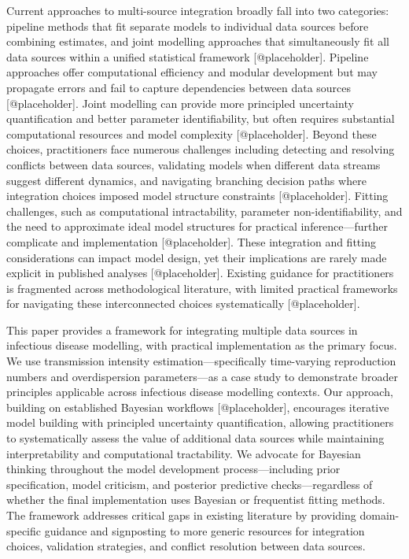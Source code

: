 \documentclass{article}
\begin{document}
Current approaches to multi-source integration broadly fall into two categories: pipeline methods that fit separate models to individual data sources before combining estimates, and joint modelling approaches that simultaneously fit all data sources within a unified statistical framework [@placeholder].
Pipeline approaches offer computational efficiency and modular development but may propagate errors and fail to capture dependencies between data sources [@placeholder].
Joint modelling can provide more principled uncertainty quantification and better parameter identifiability, but often requires substantial computational resources and model complexity [@placeholder].
Beyond these choices, practitioners face numerous challenges including detecting and resolving conflicts between data sources, validating models when different data streams suggest different dynamics, and navigating branching decision paths where integration choices imposed model structure constraints [@placeholder].
Fitting challenges, such as computational intractability, parameter non-identifiability, and the need to approximate ideal model structures for practical inference—further complicate and implementation [@placeholder].
These integration and fitting considerations can impact model design, yet their implications are rarely made explicit in published analyses [@placeholder].
Existing guidance for practitioners is fragmented across methodological literature, with limited practical frameworks for navigating these interconnected choices systematically [@placeholder].

This paper provides a framework for integrating multiple data sources in infectious disease modelling, with practical implementation as the primary focus.
We use transmission intensity estimation—specifically time-varying reproduction numbers and overdispersion parameters—as a case study to demonstrate broader principles applicable across infectious disease modelling contexts.
Our approach, building on established Bayesian workflows [@placeholder], encourages iterative model building with principled uncertainty quantification, allowing practitioners to systematically assess the value of additional data sources while maintaining interpretability and computational tractability.
We advocate for Bayesian thinking throughout the model development process—including prior specification, model criticism, and posterior predictive checks—regardless of whether the final implementation uses Bayesian or frequentist fitting methods.
The framework addresses critical gaps in existing literature by providing domain-specific guidance and signposting to more generic resources for integration choices, validation strategies, and conflict resolution between data sources.
\end{document}
